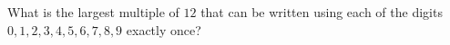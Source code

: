 What is the largest multiple of $12$ that can be written using each of the digits $0,1,2,3,4,5,6,7,8,9$ exactly once?
